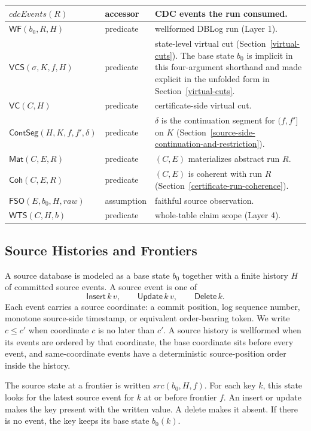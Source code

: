 \documentclass[letterpaper,10pt,twocolumn]{article}
\newcommand{\Src}{\mathit{src}}
\newcommand{\CdcEvents}{\mathit{cdcEvents}}
\newcommand{\RawObs}{\mathit{raw}}
\newcommand{\WF}{\mathsf{WF}}
\newcommand{\FSO}{\mathsf{FSO}}
\newcommand{\Mat}{\mathsf{Mat}}
\newcommand{\Coh}{\mathsf{Coh}}
\newcommand{\VC}{\mathsf{VC}}
\newcommand{\VCS}{\mathsf{VCS}}
\newcommand{\WTS}{\mathsf{WTS}}
\newcommand{\ContSeg}{\mathsf{ContSeg}}
\begin{document}
\begin{table}[t]
\begin{tabularx}{\textwidth}{@{}l@{\hskip 1em}l@{\hskip 1em}Y@{}}
$\CdcEvents(R)$ & accessor & CDC events the run consumed.\\
\midrule
$\WF(b_0,R,H)$ & predicate &
  wellformed DBLog run (Layer 1).\\
$\VCS(\sigma,K,f,H)$ & predicate &
  state-level virtual cut (Section~\ref{virtual-cuts}). The base state
  $b_0$ is implicit in this four-argument shorthand and made explicit
  in the unfolded form in Section~\ref{virtual-cuts}.\\
$\VC(C,H)$ & predicate &
  certificate-side virtual cut.\\
$\ContSeg(H,K,f,f',\delta)$ & predicate &
  $\delta$ is the continuation segment for $(f,f']$ on $K$
  (Section~\ref{source-side-continuation-and-restriction}).\\
$\Mat(C,E,R)$ & predicate &
  $(C,E)$ materializes abstract run $R$.\\
$\Coh(C,E,R)$ & predicate &
  $(C,E)$ is coherent with run $R$ (Section~\ref{certificate-run-coherence}).\\
$\FSO(E,b_0,H,\RawObs)$ & assumption &
  faithful source observation.\\
$\WTS(C,H,b)$ & predicate &
  whole-table claim scope (Layer 4).\\
\bottomrule
\end{tabularx}
\end{table}

\subsection{Source Histories and
Frontiers}\label{source-histories-and-frontiers}

A source database is modeled as a base state $b_0$ together with a
finite history $H$ of committed source events. A source event is
one of
\[
  \mathsf{Insert}\,k\,v,\qquad
  \mathsf{Update}\,k\,v,\qquad
  \mathsf{Delete}\,k.
\]
Each event carries a source coordinate: a commit position, log sequence
number, monotone source-side timestamp, or equivalent order-bearing
token. We write $c \le c'$ when
coordinate $c$ is no later than $c'$. A
source history is wellformed when its events are ordered by that
coordinate, the base coordinate sits before every event, and
same-coordinate events have a deterministic source-position order inside
the history.

The source state at a frontier is written $\Src(b_0,H,f)$.
For each key $k$, this state looks for the latest source event
for $k$ at or before frontier $f$. An insert or update
makes the key present with the written value. A delete makes it absent.
If there is no event, the key keeps its base state $b_0(k)$.
\end{document}
